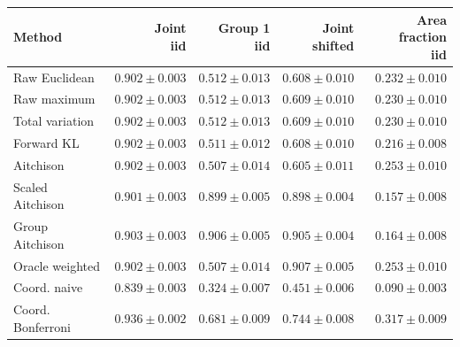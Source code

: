 \begin{tabular}{lrrrr}
\toprule
Method & \shortstack{Joint\\iid} & \shortstack{Group 1\\iid} & \shortstack{Joint\\shifted} & \shortstack{Area fraction\\iid} \\
\midrule
Raw Euclidean & $0.902\pm0.003$ & $0.512\pm0.013$ & $0.608\pm0.010$ & $0.232\pm0.010$ \\
Raw maximum & $0.902\pm0.003$ & $0.512\pm0.013$ & $0.609\pm0.010$ & $0.230\pm0.010$ \\
Total variation & $0.902\pm0.003$ & $0.512\pm0.013$ & $0.609\pm0.010$ & $0.230\pm0.010$ \\
Forward KL & $0.902\pm0.003$ & $0.511\pm0.012$ & $0.608\pm0.010$ & $0.216\pm0.008$ \\
Aitchison & $0.902\pm0.003$ & $0.507\pm0.014$ & $0.605\pm0.011$ & $0.253\pm0.010$ \\
Scaled Aitchison & $0.901\pm0.003$ & $0.899\pm0.005$ & $0.898\pm0.004$ & $0.157\pm0.008$ \\
Group Aitchison & $0.903\pm0.003$ & $0.906\pm0.005$ & $0.905\pm0.004$ & $0.164\pm0.008$ \\
Oracle weighted & $0.902\pm0.003$ & $0.507\pm0.014$ & $0.907\pm0.005$ & $0.253\pm0.010$ \\
Coord. naive & $0.839\pm0.003$ & $0.324\pm0.007$ & $0.451\pm0.006$ & $0.090\pm0.003$ \\
Coord. Bonferroni & $0.936\pm0.002$ & $0.681\pm0.009$ & $0.744\pm0.008$ & $0.317\pm0.009$ \\
\bottomrule
\end{tabular}
